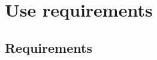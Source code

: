 \section{Use requirements}
\subsection{Requirements}
\subsubsection{\progettoShort}

\subsubsection{\app} 